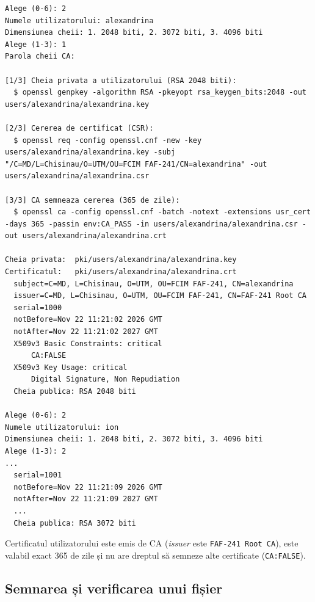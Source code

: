 \documentclass[12pt,a4paper]{article}
\begin{document}
\begin{lstlisting}[style=terminal, caption={Emiterea cheii și a certificatului pentru un utilizator}]
Alege (0-6): 2
Numele utilizatorului: alexandrina
Dimensiunea cheii: 1. 2048 biti, 2. 3072 biti, 3. 4096 biti
Alege (1-3): 1
Parola cheii CA:

[1/3] Cheia privata a utilizatorului (RSA 2048 biti):
  $ openssl genpkey -algorithm RSA -pkeyopt rsa_keygen_bits:2048 -out users/alexandrina/alexandrina.key

[2/3] Cererea de certificat (CSR):
  $ openssl req -config openssl.cnf -new -key users/alexandrina/alexandrina.key -subj "/C=MD/L=Chisinau/O=UTM/OU=FCIM FAF-241/CN=alexandrina" -out users/alexandrina/alexandrina.csr

[3/3] CA semneaza cererea (365 de zile):
  $ openssl ca -config openssl.cnf -batch -notext -extensions usr_cert -days 365 -passin env:CA_PASS -in users/alexandrina/alexandrina.csr -out users/alexandrina/alexandrina.crt

Cheia privata:  pki/users/alexandrina/alexandrina.key
Certificatul:   pki/users/alexandrina/alexandrina.crt
  subject=C=MD, L=Chisinau, O=UTM, OU=FCIM FAF-241, CN=alexandrina
  issuer=C=MD, L=Chisinau, O=UTM, OU=FCIM FAF-241, CN=FAF-241 Root CA
  serial=1000
  notBefore=Nov 22 11:21:02 2026 GMT
  notAfter=Nov 22 11:21:02 2027 GMT
  X509v3 Basic Constraints: critical
      CA:FALSE
  X509v3 Key Usage: critical
      Digital Signature, Non Repudiation
  Cheia publica: RSA 2048 biti

Alege (0-6): 2
Numele utilizatorului: ion
Dimensiunea cheii: 1. 2048 biti, 2. 3072 biti, 3. 4096 biti
Alege (1-3): 2
...
  serial=1001
  notBefore=Nov 22 11:21:09 2026 GMT
  notAfter=Nov 22 11:21:09 2027 GMT
  ...
  Cheia publica: RSA 3072 biti
\end{lstlisting}

Certificatul utilizatorului este emis de CA (\textit{issuer} este
\texttt{FAF-241 Root CA}), este valabil exact 365 de zile și nu are dreptul să
semneze alte certificate (\texttt{CA:FALSE}).

\subsection{Semnarea și verificarea unui fișier}
\end{document}
